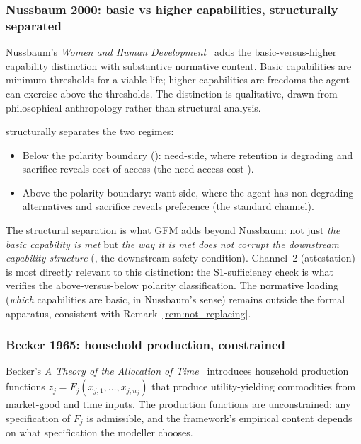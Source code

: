 \subsubsection{Nussbaum 2000: basic vs higher capabilities, structurally separated}

Nussbaum's \emph{Women and Human
Development}~\citep{nussbaum2000women} adds the basic-versus-higher
capability distinction with substantive normative content.  Basic
capabilities are minimum thresholds for a viable life; higher
capabilities are freedoms the agent can exercise above the
thresholds.  The distinction is qualitative, drawn from
philosophical anthropology rather than structural analysis.

\citep[Need~Sufficiency]{lasser2026paper8b} structurally
separates the two regimes:
\begin{itemize}
\item Below the polarity boundary
  (\citep[Definition~3]{lasser2026paper8b}): need-side, where
  retention is degrading and sacrifice reveals cost-of-access
  (the need-access cost \citep[Definition~9]{lasser2026paper8b}).
\item Above the polarity boundary: want-side, where the agent has
  non-degrading alternatives and sacrifice reveals preference
  (the standard \citep[Revealed~Sacrifice]{lasser2026paper8a}
  channel).
\end{itemize}
The structural separation is what GFM adds beyond Nussbaum:
not just \emph{the basic capability is met} but \emph{the way it
is met does not corrupt the downstream capability structure}
(\citep[Definition~2(b)]{lasser2026paper8b}, the downstream-safety
condition).  Channel~2 (attestation) is most directly relevant to
this distinction: the S1-sufficiency check is what verifies the
above-versus-below polarity classification.  The normative
loading (\emph{which} capabilities are basic, in Nussbaum's
sense) remains outside the formal apparatus, consistent with
Remark~\ref{rem:not_replacing}.

\subsubsection{Becker 1965: household production, constrained}

Becker's \emph{A Theory of the Allocation of
Time}~\citep{becker1965theory} introduces household production
functions $z_j = F_j(x_{j,1}, \dots, x_{j,n_j})$ that produce
utility-yielding commodities from market-good and time inputs.
The production functions are unconstrained: any specification of
$F_j$ is admissible, and the framework's empirical content depends
on what specification the modeller chooses.

